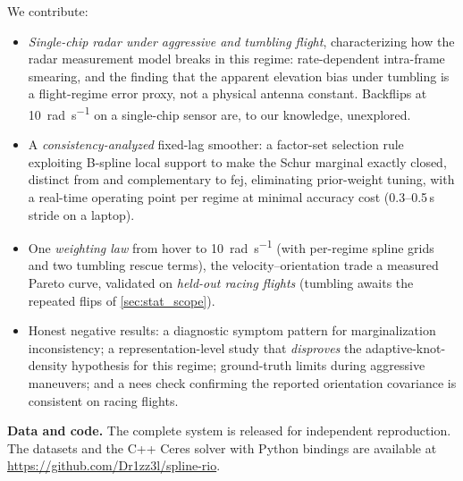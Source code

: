 We contribute:
\begin{itemize}
  \item \emph{Single-chip radar under aggressive and tumbling flight},
        characterizing how the radar measurement model breaks in this
        regime: rate-dependent intra-frame smearing, and the finding
        that the apparent elevation bias under tumbling is a
        flight-regime error proxy, not a physical antenna constant.
        Backflips at \SI{10}{\radian\per\second} on a single-chip
        sensor are, to our knowledge, unexplored.
  \item A \emph{consistency-analyzed} fixed-lag smoother: a factor-set
        selection rule exploiting B-spline local support to make the
        Schur marginal exactly closed, distinct from and
        complementary to \ac{fej}, eliminating prior-weight tuning, with a
        real-time operating point per regime at minimal accuracy cost
        (0.3--0.5\,s stride on a laptop).
  \item One \emph{weighting law} from hover to
        \SI{10}{\radian\per\second} (with per-regime spline grids and two
        tumbling rescue terms), the velocity--orientation trade a measured
        Pareto curve, validated on \emph{held-out racing flights}
        (tumbling awaits the repeated flips of \autoref{sec:stat_scope}).
  \item Honest negative results: a diagnostic symptom pattern for
        marginalization inconsistency; a representation-level study
        that \emph{disproves} the adaptive-knot-density hypothesis for
        this regime; ground-truth limits during aggressive maneuvers;
        and a \ac{nees} check confirming the reported orientation covariance
        is consistent on racing flights.
\end{itemize}

\textbf{Data and code.}
The complete system is released for independent reproduction.  The datasets
and the C++ Ceres solver with Python bindings are available at
\url{https://github.com/Dr1zz3l/spline-rio}.
